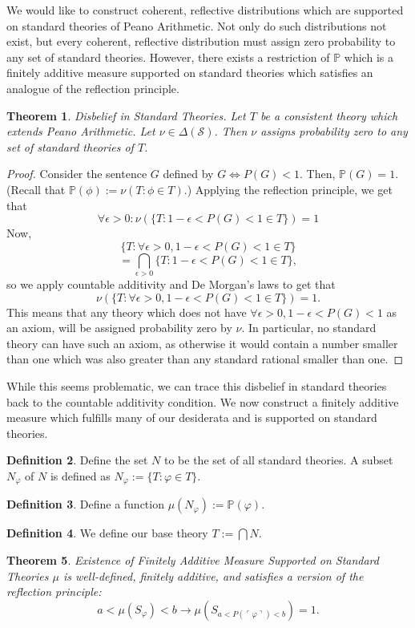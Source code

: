 \documentclass[12pt]{article}
\newcommand{\PP}{\mathbb{P}}
\newcommand{\vp}{\varphi}
\theoremstyle{plain}
\newtheorem{theorem}{Theorem}[subsection]
\theoremstyle{definition}
\newtheorem{definition}[theorem]{Definition}
\theoremstyle{remark}
\begin{document}
We would like to construct coherent, reflective distributions which are supported on standard theories of Peano Arithmetic.
Not only do such distributions not exist, but every coherent, reflective distribution must assign zero probability to any set of standard theories. 
However, there exists a restriction of $\PP$ which is a finitely additive measure supported on standard theories which satisfies an analogue of the reflection principle.
\begin{theorem} \emph{Disbelief in Standard Theories.}
Let $T$ be a consistent theory which extends Peano Arithmetic.
Let $\nu\in\Delta(\mathcal{S})$.
Then $\nu$ assigns probability zero to any set of standard theories of $T$.
\end{theorem}
\begin{proof}
Consider the sentence $G$ defined by $G \iff P(G) < 1$.
Then, $\PP(G)=1$. (Recall that $\PP(\phi):=\nu({T:\phi\in T})$.)
Applying the reflection principle, we get that 
$$\forall\epsilon>0: \nu(\{T:1-\epsilon<P(G)<1\in T\})=1$$
Now, 
$$\{T:\forall \epsilon>0,1-\epsilon<P(G)<1\in T\}$$
$$=\bigcap_{\epsilon>0}\{T:1-\epsilon<P(G)<1\in T\},$$ so we apply countable additivity and De Morgan's laws to get that $$\nu(\{T:\forall \epsilon>0,1-\epsilon<P(G)<1\in T\})=1.$$
This means that any theory which does not have $\forall \epsilon>0,1-\epsilon<P(G)<1$ as an axiom, will be assigned probability zero by $\nu$.
In particular, no standard theory can have such an axiom, as otherwise it would contain a number smaller than one which was also greater than any standard rational smaller than one.
\end{proof}
While this seems problematic, we can trace this disbelief in standard theories back to the countable additivity condition. We now construct a finitely additive measure which fulfills many of our desiderata and is supported on standard theories.
\begin{definition}
Define the set $N$ to be the set of all standard theories. A subset $N_{\vp}$ of $N$ is defined as $N_{\vp}:=\{T:\vp\in T\}$.
\end{definition}
\begin{definition}
Define a function $\mu(N_{\vp}):=\PP(\vp)$.
\end{definition}
\begin{definition}
We define our base theory $T:=\bigcap N$.
\end{definition}
\begin{theorem} \emph{Existence of Finitely Additive Measure Supported on Standard Theories}
$\mu$ is well-defined, finitely additive, and satisfies a version of the reflection principle:
$$a < \mu(S_{\vp}) < b \rightarrow \mu(S_{a < P(\ulcorner \vp \urcorner) < b}) = 1.$$
\end{theorem}
\end{document}

